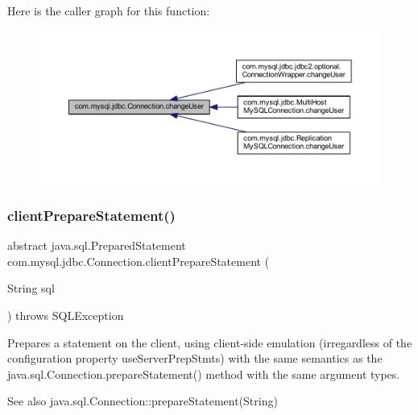 Here is the caller graph for this function\+:\nopagebreak
\begin{figure}[H]
\begin{center}
\leavevmode
\includegraphics[width=350pt]{interfacecom_1_1mysql_1_1jdbc_1_1_connection_a6a6160ecb2c19b5f246450ba9252907d_icgraph}
\end{center}
\end{figure}
\mbox{\label{interfacecom_1_1mysql_1_1jdbc_1_1_connection_a1836d2e9bc2f4f47fb77b2418d08616a}} 
\subsubsection{\texorpdfstring{client\+Prepare\+Statement()}{clientPrepareStatement()}\hspace{0.1cm}{\footnotesize\ttfamily [1/6]}}
{\footnotesize\ttfamily abstract java.\+sql.\+Prepared\+Statement com.\+mysql.\+jdbc.\+Connection.\+client\+Prepare\+Statement (\begin{DoxyParamCaption}\item[{String}]{sql }\end{DoxyParamCaption}) throws S\+Q\+L\+Exception\hspace{0.3cm}{\ttfamily [abstract]}}

Prepares a statement on the client, using client-\/side emulation (irregardless of the configuration property \textquotesingle{}use\+Server\+Prep\+Stmts\textquotesingle{}) with the same semantics as the java.\+sql.\+Connection.\+prepare\+Statement() method with the same argument types.

\begin{DoxySeeAlso}{See also}
java.\+sql.\+Connection\+::prepare\+Statement(\+String) 
\end{DoxySeeAlso}


